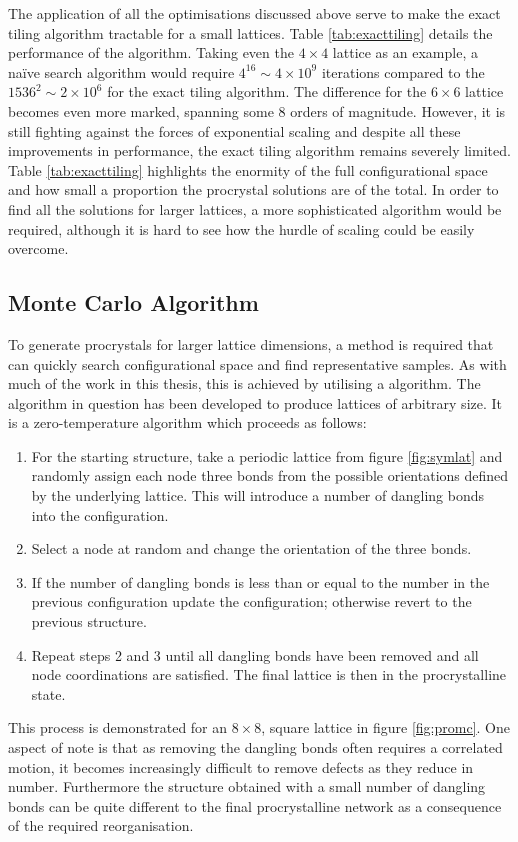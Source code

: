 The application of all the optimisations discussed above serve to make the exact tiling algorithm tractable for a small lattices.
Table \ref{tab:exacttiling} details the performance of the algorithm.
Taking even the $4\times 4$ lattice as an example, a na\"ive search algorithm would require $4^{16}\sim 4\times10^9$ iterations compared to the $1536^2\sim 2\times10^6$ for the exact tiling algorithm.
The difference for the $6\times 6$ lattice becomes even more marked, spanning some 8 orders of magnitude.
However, it is still fighting against the forces of exponential scaling and despite all these improvements in performance, the exact tiling algorithm remains severely limited. 
Table \ref{tab:exacttiling} highlights the enormity of the full configurational space and how small a proportion the procrystal solutions are of the total.
In order to find all the solutions for larger lattices, a more sophisticated algorithm would be required, although it is hard to see how the hurdle of scaling could be easily overcome.

\subsection{Monte Carlo Algorithm}
\label{s:promc}

To generate procrystals for larger lattice dimensions, a method is required that can quickly search configurational space and find representative samples.
As with much of the work in this thesis, this is achieved by utilising a \mc{} algorithm.
The algorithm in question has been developed to produce lattices of arbitrary size.
It is a zero\--temperature \mc{} algorithm which proceeds as follows:
\begin{enumerate}
	\item For the starting structure, take a periodic lattice from figure \ref{fig:symlat} and randomly assign each node three bonds from the possible orientations defined by the underlying lattice. This will introduce a number of dangling bonds into the configuration.
	\item Select a node at random and change the orientation of the three bonds.
	\item If the number of dangling bonds is less than or equal to the number in the previous configuration update the configuration; otherwise revert to the previous structure.
	\item Repeat steps 2 and 3 until all dangling bonds have been removed and all node coordinations are satisfied.
	The final lattice is then in the procrystalline state.
\end{enumerate}
This process is demonstrated for an $8\times 8$, square lattice in figure \ref{fig:promc}.
One aspect of note is that as removing the dangling bonds often requires a correlated motion, it becomes increasingly difficult to remove defects as they reduce in number.
Furthermore the structure obtained with a small number of dangling bonds can be quite different to the final procrystalline network as a consequence of the required reorganisation.

